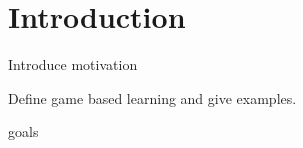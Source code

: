 \chapter{Introduction}
Introduce motivation

Define game based learning and give examples. 

goals 
